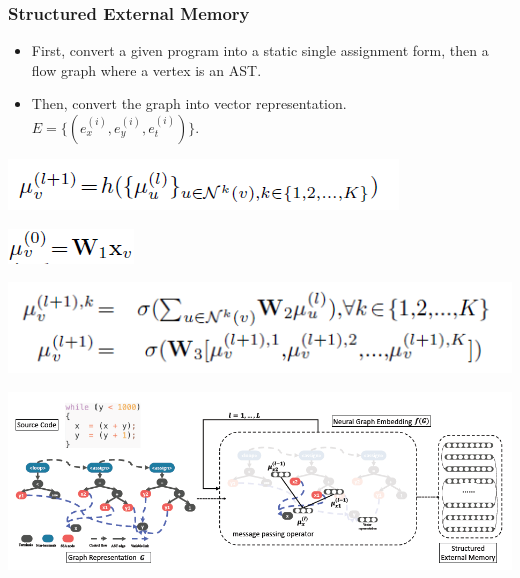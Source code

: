 \documentclass[11pt]{beamer}
\begin{document}
\begin{frame}\frametitle{Structured External Memory}
\begin{itemize}
\item First, convert a given program into a static single assignment form, then a flow graph where a vertex is an AST.

\item Then, convert the graph into vector representation. $E = \{(e_x^{(i)}, e_y^{(i)},e_t^{(i)})\}$.

\end{itemize}
\begin{center}

\includegraphics[scale = 0.4]{6.png}

\includegraphics[scale = 0.4]{5.png}

\includegraphics[scale = 0.4]{4.png}

\includegraphics[scale = 0.4]{3.png}
\end{center}

\end{frame}
\end{document}
